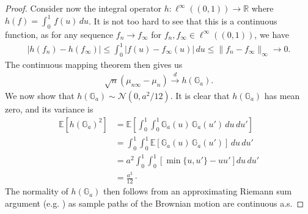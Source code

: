 \documentclass[11pt,a4paper]{article}
\newcommand{\R}{\mathbb{R}}
\newcommand{\E}{\mathbb{E}}
\begin{document}
\begin{appendices}
\begin{proof}
Consider now the integral operator $h: \ell^\infty((0,1)) \to \R$ where $h(f) = \int_0^1 \, f(u) \, du$. It is not too hard to see that this is a continuous function, as for any sequence $f_n \to f_\infty$ for $f_n,f_\infty \in \ell^\infty((0,1))$, we have
\begin{align*}
    |h(f_n) - h(f_\infty)| \leq \int_0^1 |f(u) - f_\infty(u)|\, du \leq \|f_n - f_\infty\|_{\infty} \to 0.
\end{align*}
The continuous mapping theorem then gives us
\begin{align*}
\sqrt{n}(\mu_{n\infty} - \mu_n) \overset{d}{\to} h(\mathbb{G}_a).
\end{align*}
We now show that $h(\mathbb{G}_a) \sim \mathcal{N}(0,a^2/12)$. It is clear that $h(\mathbb{G}_a)$ has mean zero, and its variance is
\begin{align*}
   \E\left[h(\mathbb{G}_a)^2 \right] 
   &=
    \E\left[\int_0^1 \int_0^1\mathbb{G}_a(u) \, \mathbb{G}_a(u')\, du \, du'\right]
   \\&=\int_0^1 \int_0^1 \E\left[\mathbb{G}_a(u) \, \mathbb{G}_a(u')\right]\, du \, du'\\
  &= a^2\int_0^1 \int_0^1\left[\min\{u,u'\}- uu'\right] du \, du' \\
  &= \frac{a^2}{12}\cdot
\end{align*}
The normality of $h(\mathbb{G}_a)$ then follows from an approximating Riemann sum argument (e.g. \cite[Chapter 8.3]{Hassler2016}) as sample paths of the Brownian motion are continuous a.s. 
\end{proof}


\end{appendices}
\end{document}
